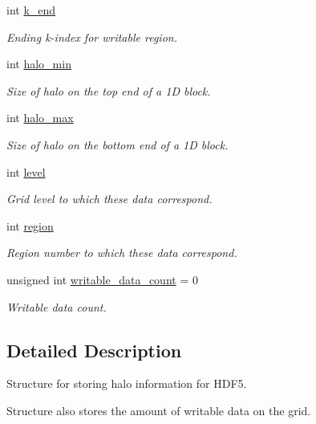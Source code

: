 \begin{DoxyCompactItemize}
int \hyperlink{struct_mpi_manager_1_1phdf5__struct_a2490c17798ca6cf4db002fa521f170c0}{k\+\_\+end}
\begin{DoxyCompactList}\small\item\em Ending k-\/index for writable region. \end{DoxyCompactList}\item 
int \hyperlink{struct_mpi_manager_1_1phdf5__struct_a1ea3307d7dac34273ee8a7b1014273fe}{halo\+\_\+min}
\begin{DoxyCompactList}\small\item\em Size of halo on the top end of a 1D block. \end{DoxyCompactList}\item 
int \hyperlink{struct_mpi_manager_1_1phdf5__struct_af6509514433ef18c04217b54ce4614a0}{halo\+\_\+max}
\begin{DoxyCompactList}\small\item\em Size of halo on the bottom end of a 1D block. \end{DoxyCompactList}\item 
int \hyperlink{struct_mpi_manager_1_1phdf5__struct_aa3f8cc807724b61ef3a37509f71100ab}{level}
\begin{DoxyCompactList}\small\item\em Grid level to which these data correspond. \end{DoxyCompactList}\item 
int \hyperlink{struct_mpi_manager_1_1phdf5__struct_a1a9978693d5b50cb83b8ccc78fb23a6d}{region}
\begin{DoxyCompactList}\small\item\em Region number to which these data correspond. \end{DoxyCompactList}\item 
unsigned int \hyperlink{struct_mpi_manager_1_1phdf5__struct_a5b487966cec847dfba96a869e9adb7f0}{writable\+\_\+data\+\_\+count} = 0
\begin{DoxyCompactList}\small\item\em Writable data count. \end{DoxyCompactList}\end{DoxyCompactItemize}


\subsection{Detailed Description}
Structure for storing halo information for H\+D\+F5. 

Structure also stores the amount of writable data on the grid. 

